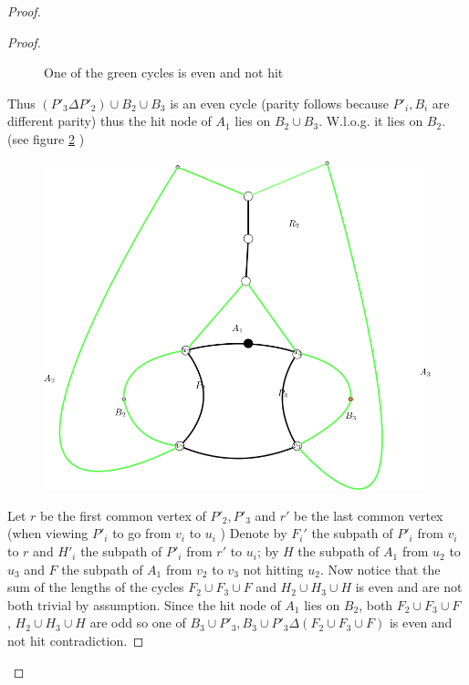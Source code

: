 \documentclass[letterpaper,11pt]{article}
\newcommand{\0}{\mathbb{0}}
\newcommand{\1}{\mathbb{1}}
\begin{document}
\begin{proof}
\begin{proof}
\begin{figure}[h]
    \caption{One of the green cycles is even and not hit}
    \label{case1contr}
\end{figure}  
Thus $ (P'_3 \Delta P'_2 ) \cup B_2\cup B_3 $ is an even cycle (parity follows because $P'_i , B_i $ are different parity) thus the hit node of $A_1$ lies on $B_2 \cup B_3$. W.l.o.g. it lies on $B_2$. (see figure \ref{case1contr2}  )
\begin{figure}[h]     \includegraphics[scale=0.23]{Case1Contr2.png}      \caption{}     \label{case1contr2}
\end{figure}
Let $r$  be the first common vertex of $P'_2, P'_3$ and $r'$ be the last common vertex (when viewing $P'_i$ to go from $v_i$ to $u_i$  ) Denote by $F_i'$ the subpath of $P'_i$ from $v_i$ to $r$  and   $H'_i$ the subpath of $P'_i$ from $r'$ to $u_i$;  by $H$ the subpath of  $A_1$ from  $u_2$ to $u_3$  and $F$ the subpath of $A_1$ from $v_2$ to $v_3$ not hitting $u_2$. Now notice that the sum of the lengths of the cycles $F_2 \cup F_3 \cup F$ and $H_2 \cup H_3 \cup H$ is even and are not both trivial by assumption. Since the hit node of $A_1$ lies on $B_2$, both  $F_2 \cup F_3 \cup F$ , $H_2 \cup H_3 \cup H$  are odd so one of $ B_3 \cup P'_3 ,  B_3 \cup P'_3 \Delta (F_2 \cup F_3 \cup F) $ is even and not hit contradiction.


\end{proof}
\end{proof}
\end{document}
